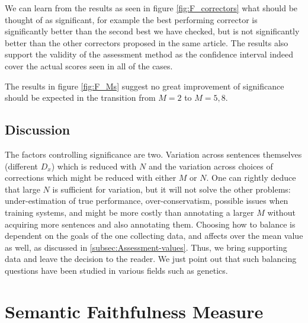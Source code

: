 \documentclass[letter,11pt]{article}
\newcommand{\com}[1]{}
\newcommand{\lc}[1]{\footnote{\color{green}LC: #1}}
\begin{document}
		We can learn from the results as seen in figure \ref{fig:F_correctors} what should be thought of as significant, for example the best performing corrector is significantly better than the second best we have checked, but is not significantly better than the other correctors proposed in the same article\cite{rozovskaya2016grammatical}. The results also  support the validity of the assessment method as the confidence interval indeed cover the actual scores seen in all of the cases. 
		
		The results in figure \ref{fig:F_Ms} suggest no great improvement of significance should be expected in the transition from $M=2$ to $M=5,8$.
		
		\subsection{Discussion}
		
		The factors controlling significance are two. Variation across sentences themselves (different $D_x$) which is reduced with $N$ and the variation across choices of corrections which might be reduced with either $M$ or $N$. One can rightly deduce that large $N$ is sufficient for variation, but it will not solve the other problems: under-estimation of true performance,
		over-conservatism, possible issues when training systems, and might be more costly than annotating a larger $M$ without acquiring more sentences and also annotating them.
		Choosing how to balance is dependent on the goals of the one collecting data, and affects over the mean value as well, as discussed in \ref{subsec:Assessment-values}. Thus, we bring supporting data and leave the decision to the reader. We just point out that such balancing questions have been studied in various fields such as genetics\cite{ionita2010optimal}.
		
		\com{\lc{I think this can be omitted}
			So, why is significance more complicated? Basically, because variance is more complex than mean. While $\mathbb{E}_{y\sim d_x, x\sim L}\left(\hat{S}\right)$ vary only as we change $M$
			the number of annotations, but not $N$ the number of corrections,
			$Var_{y\sim d_x, x\sim L}(\hat{S})$ depends on both. We try to assess and give an upper
			bound on how much it varies for different $M$ and $N$, allowing
			for both a smart allocation of resources when building a corpus and for assessing on given corpora whether two correctors are actually different.
		}
		

\section{Semantic Faithfulness Measure}\label{sec:Semantics}
\end{document}
